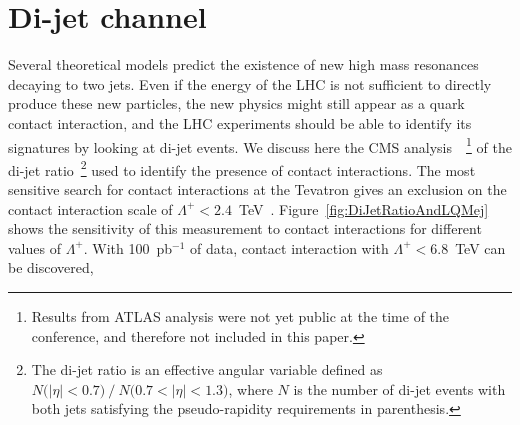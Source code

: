 \documentclass{cimento}
\begin{document}
\section{Di-jet channel} \label{dijet}
Several theoretical models predict the existence of new 
high mass resonances decaying to two 
jets.
Even if the energy of the LHC is not sufficient to directly produce 
these new particles, the new physics might still appear as 
a quark contact interaction,
and the LHC experiments should 
be able to identify its signatures by looking at di-jet events.
%
We discuss here the CMS analysis~\cite{DIJETSNOTE}~\footnote{Results 
from ATLAS analysis were not yet public at the time 
of the conference, and therefore not included in this paper.}
of the di-jet ratio~\footnote{
The di-jet ratio is an effective angular variable
defined as $N\mbox{(}|\eta|<0.7\mbox{)}~/~N\mbox{(}0.7<|\eta|< 1.3 \mbox{)}$, 
where $N$ is the number of di-jet events with both jets satisfying the 
pseudo-rapidity requirements in parenthesis.} 
used to identify the presence of contact interactions. 
The most sensitive search for contact interactions at the Tevatron 
gives an exclusion on the contact interaction scale 
of $\Lambda^{+} < 2.4$~TeV~\cite{Abbott:1998wh}.  
Figure~\ref{fig:DiJetRatioAndLQMej} 
shows the sensitivity of this measurement to contact interactions 
for different values of $\Lambda^{+}$. With 100~pb$^{-1}$ of data, 
contact interaction with $\Lambda^{+} < 6.8$~TeV can be discovered, 
\end{document}
